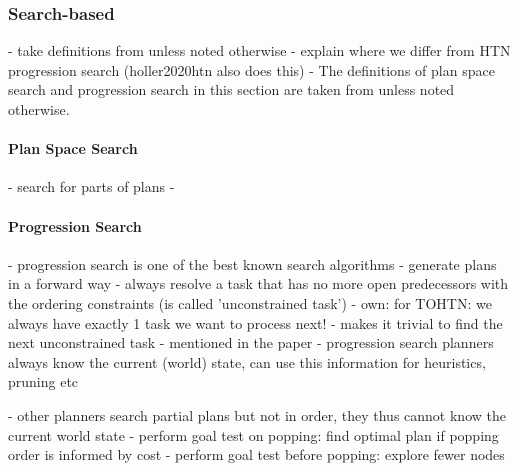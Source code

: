 \begin{comment}
- may translate to classical planning \cite{alford2016bound}
- SAT-based has been known since 1998 \cite{mali1998encoding}
- tend to explore the hierarchy layer-by-layer \cite{schreiber2019tree}
- this gives the search a BFS-like characteristic
- this is needed, as SAT is NP-complete compared to HTN which is undecidable and TOHTN which is in D-EXPTIME \ref{prelim: tohtn complexity}
- encoding the whole instance would be impossible in case of HTN and lead to blowup in instance size in case of TOHTN
- going bit by bit is done instead

- example planners are Tree-REX \cite{schreiber2019tree}, totSAT \cite{behnke2018totsat}, Lilotane \cite{schreiber2021lilotane}
\end{comment}

\subsubsection{Search-based}
- take definitions from \cite{holler2020htn} unless noted otherwise
- explain where we differ from HTN progression search (holler2020htn also does this)
- 
The definitions of plan space search and progression search in this section are taken from \cite{holler2020htn} unless noted otherwise.

\paragraph{Plan Space Search}
- search for parts of plans
- 

\paragraph{Progression Search}
\label{prelim: progression search}
\cite{holler2020htn}
	- progression search is one of the best known search algorithms
	- generate plans in a forward way
	- always resolve a task that has no more open predecessors with the ordering constraints (is called 'unconstrained task')
		- own: for TOHTN: we always have exactly 1 task we want to process next!
		- makes it trivial to find the next unconstrained task
		- mentioned in the paper
	- progression search planners always know the current (world) state, can use this information for heuristics, pruning etc
	
	- other planners search partial plans but not in order, they thus cannot know the current world state
	- perform goal test on popping: find optimal plan if popping order is informed by cost
	- perform goal test before popping: explore fewer nodes
	
